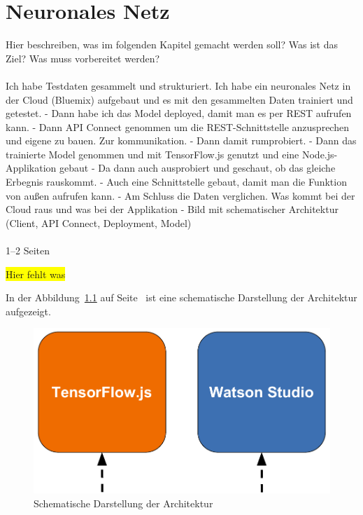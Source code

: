 \chapter{Neuronales Netz}
\label{ch:neuronalesNetz}

Hier beschreiben, was im folgenden Kapitel gemacht werden soll? Was ist das Ziel? Was muss vorbereitet werden?
\\ \\
Ich habe Testdaten gesammelt und strukturiert. Ich habe ein neuronales Netz in der Cloud (Bluemix) aufgebaut und es
mit den gesammelten Daten trainiert und getestet. - Dann habe ich das Model deployed, damit man es per REST aufrufen kann.
- Dann API Connect genommen um die REST-Schnittstelle anzusprechen und eigene zu bauen. Zur kommunikation.
- Dann damit rumprobiert. - Dann das trainierte Model genommen und mit TensorFlow.js genutzt und eine Node.js-Applikation gebaut
- Da dann auch ausprobiert und geschaut, ob das gleiche Erbegnis rauskommt.
- Auch eine Schnittstelle gebaut, damit man die Funktion von außen aufrufen kann. - Am Schluss die Daten verglichen. Was
kommt bei der Cloud raus und was bei der Applikation - Bild mit schematischer Architektur (Client, API Connect, Deployment, Model)
\\ \\
1--2 Seiten

\colorbox{yellow}{Hier fehlt was}

In der Abbildung~\ref{fig:schematische_architektur} auf Seite~\pageref{fig:schematische_architektur} ist eine schematische
Darstellung der Architektur aufgezeigt.

\begin{figure}[h]
    \centering
    \includegraphics[scale=0.5]{images/kapitel_3/architektur_schematisch.pdf}
    \caption{Schematische Darstellung der Architektur}
    \label{fig:schematische_architektur}
\end{figure}